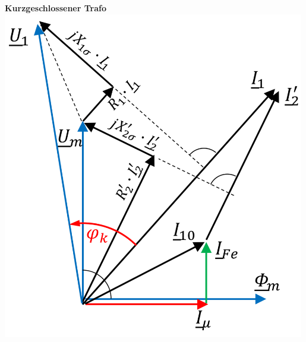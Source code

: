 \begin{minipage}{0.33\textwidth}
\textbf{Kurzgeschlossener Trafo}\\
\includegraphics[width=0.99\textwidth]{bilder/trafo_kurz.png}
\end{minipage}
	    

	    
